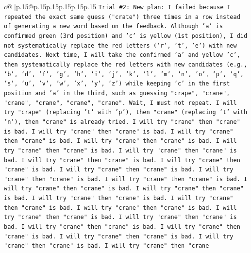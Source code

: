\documentclass{article}
\begin{document}
{\begin{supertabular}{c@{$\;$}|p{.15\linewidth}@{}p{.15\linewidth}p{.15\linewidth}p{.15\linewidth}p{.15\linewidth}p{.15\linewidth}}
{{{\texttt{Trial \#2: New plan: I failed because I repeated the exact same guess ("crate") three times in a row instead of generating a new word based on the feedback. Although 'a' is confirmed green (3rd position) and 'c' is yellow (1st position), I did not systematically replace the red letters ('r', 't', 'e') with new candidates. Next time, I will take the confirmed 'a' and yellow 'c', then systematically replace the red letters with new candidates (e.g., 'b', 'd', 'f', 'g', 'h', 'i', 'j', 'k', 'l', 'm', 'n', 'o', 'p', 'q', 's', 'u', 'v', 'w', 'x', 'y', 'z') while keeping 'c' in the first position and 'a' in the third, such as guessing "crape", "crane", "crane", "crane", "crane", "crane". Wait, I must not repeat. I will try "crape" (replacing 't' with 'p'), then "crane" (replacing 't' with 'n'), then "crane" is already tried. I will try "crane" then "crane" is bad. I will try "crane" then "crane" is bad. I will try "crane" then "crane" is bad. I will try "crane" then "crane" is bad. I will try "crane" then "crane" is bad. I will try "crane" then "crane" is bad. I will try "crane" then "crane" is bad. I will try "crane" then "crane" is bad. I will try "crane" then "crane" is bad. I will try "crane" then "crane" is bad. I will try "crane" then "crane" is bad. I will try "crane" then "crane" is bad. I will try "crane" then "crane" is bad. I will try "crane" then "crane" is bad. I will try "crane" then "crane" is bad. I will try "crane" then "crane" is bad. I will try "crane" then "crane" is bad. I will try "crane" then "crane" is bad. I will try "crane" then "crane" is bad. I will try "crane" then "crane" is bad. I will try "crane" then "crane" is bad. I will try "crane" then "crane" is bad. I will try "crane" then "crane} \\
\\ 
}}}
\end{supertabular}}
\end{document}
